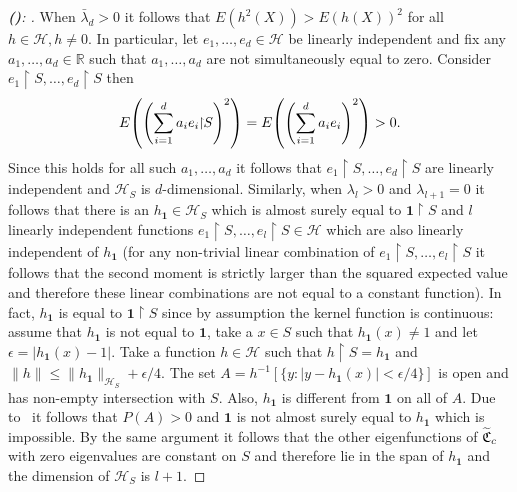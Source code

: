 \documentclass[AHL,Unicode,longabstracts,published]{cedram}
\theoremstyle{remark}
\newcommand{\restrr}
{\!\!\upharpoonright\!\!}
\newcommand{\R}{\mathbb{R}}
\newcommand{\cH}{\mathcal{H}}
\newcommand{\fkC}{\mathfrak{C}}
\let\oldtilde\tilde
\renewcommand*{\tilde}[1]{\mathchoice{\widetilde{#1}}{\widetilde{#1}}{\oldtilde{#1}}{\oldtilde{#1}}}
\let\originalleft\left
\let\originalright\right
\renewcommand{\left}{\mathopen{}\mathclose\bgroup\originalleft}
\renewcommand{\right}{\aftergroup\egroup\originalright}
\newcounter{setofstep}
\newcounter{step}[setofstep]
\newenvironment{step}[1][]{\refstepcounter{step}\begin{proof}[{\textbf{(\thestep)}\if#1\empty\else: #1\fi}]}{\let\qed\relax\end{proof}}
\newcommand{\newstepset}{\stepcounter{setofstep}}
\renewcommand{\thestep}{\alph{step}}
\begin{document}
\begin{proofc}
\newstepset
\begin{step}\label{prfprop2.15stp1}
When $\bar\lambda_d >0$ it follows that $E(h^2(X)) > E(h(X))^2$ for all $h \in \cH, h \not = 0$. In particular, let $e_1,\dots, e_d \in \cH$ be linearly independent and fix any $a_1,\dots, a_d \in \R$ such that $a_1, \dots, a_d$ are not simultaneously equal to zero. Consider $e_1\restrr S, \dots, e_d\restrr S$ then
\[
E\left(\left(\sum_{i=1}^d a_i e_i\restrr S\right)^2 \right) = E\left(\left(\sum_{i=1}^d a_i e_i \right)^2 \right) > 0.
\]
Since this holds for all such $a_1,\dots, a_d$ it follows that $e_1\restrr S, \dots, e_d\restrr S$ are linearly independent and $\cH_S$ is $d$-dimensional. Similarly, when $\lambda_l > 0$ and $\lambda_{l+1} = 0$ it follows that there is an $h_{\bm 1} \in \cH_S$ which is almost surely equal to $\bm 1 \restrr S$ and $l$ linearly independent functions $e_1\restrr S,\dots, e_l\restrr S \in \cH$ which are also linearly independent of $h_{\bm 1}$ (for any non-trivial linear combination of $e_1\restrr S,\dots, e_l\restrr S$ it follows that the second moment is strictly larger than the squared expected value and therefore these linear combinations are not equal to a constant function). In fact, $h_{\bm 1}$ is equal to $\bm 1\restrr S$ since by assumption the kernel function is continuous: assume that $h_{\bm 1}$ is not equal to $\bm 1$, take a $x\in S$ such that $h_{\bm 1}(x) \not = 1$ and let $\epsilon = | h_{\bm 1}(x) - 1|$. Take a function $h\in \cH$ such that $h\restrr S = h_{\bm 1}$ and $\|h\| \leq \|h_{\bm 1}\|_{\cH_S} + \epsilon/4$. The set $A = h^{-1}[\{y: |y - h_{\bm 1}(x)| < \epsilon/4 \}]$ is open and has non-empty intersection with $S$. Also, $h_{\bm 1}$ is different from $\bm 1$ on all of $A$. Due to~\cite[411N]{FREM} it follows that $P(A)>0$ and $\bm 1$ is not almost surely equal to $h_{\bm 1}$ which is impossible. By the same argument it follows that the other eigenfunctions of $\tilde{\fkC}_c$ with zero eigenvalues are constant on $S$ and therefore lie in the span of $h_{\bm 1}$ and the dimension of $\cH_S$ is $l+1$.
\end{step}


\end{proofc}
\end{document}
